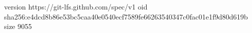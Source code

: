 version https://git-lfs.github.com/spec/v1
oid sha256:e4dcd8b86e53bc5caa40e0540ecf7589fe66263540347c0fac01e1f9d80d619b
size 9055
